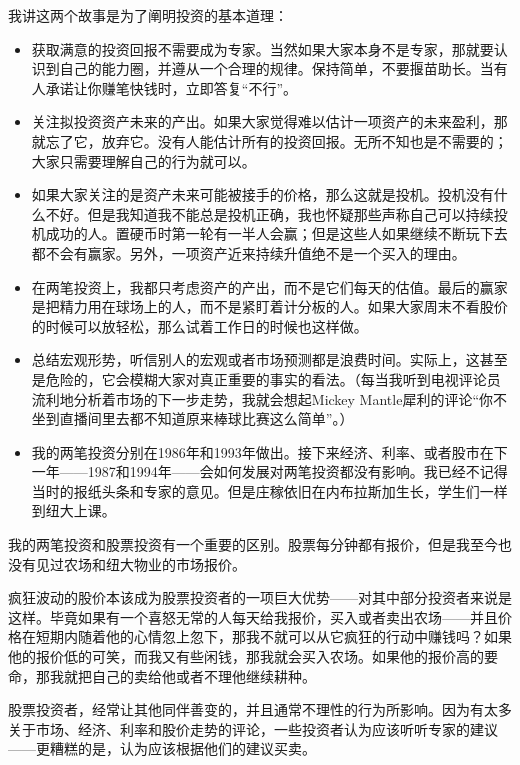 \documentclass[UTF8,a4paper,zihao=-4,fontset = windows]{ctexart} %
\begin{document}
我讲这两个故事是为了阐明投资的基本道理：
\begin{itemize}
    \item \noindent 获取满意的投资回报不需要成为专家。当然如果大家本身不是专家，那就要认识到自己的能力圈，并遵从一个合理的规律。保持简单，不要揠苗助长。当有人承诺让你赚笔快钱时，立即答复“不行”。

    \item \noindent 关注拟投资资产未来的产出。如果大家觉得难以估计一项资产的未来盈利，那就忘了它，放弃它。没有人能估计所有的投资回报。无所不知也是不需要的；大家只需要理解自己的行为就可以。

    \item \noindent 如果大家关注的是资产未来可能被接手的价格，那么这就是投机。投机没有什么不好。但是我知道我不能总是投机正确，我也怀疑那些声称自己可以持续投机成功的人。置硬币时第一轮有一半人会赢；但是这些人如果继续不断玩下去都不会有赢家。另外，一项资产近来持续升值绝不是一个买入的理由。

    \item \noindent 在两笔投资上，我都只考虑资产的产出，而不是它们每天的估值。最后的赢家是把精力用在球场上的人，而不是紧盯着计分板的人。如果大家周末不看股价的时候可以放轻松，那么试着工作日的时候也这样做。

    \item \noindent 总结宏观形势，听信别人的宏观或者市场预测都是浪费时间。实际上，这甚至是危险的，它会模糊大家对真正重要的事实的看法。（每当我听到电视评论员流利地分析着市场的下一步走势，我就会想起Mickey Mantle犀利的评论“你不坐到直播间里去都不知道原来棒球比赛这么简单”。）

    \item \noindent 我的两笔投资分别在1986年和1993年做出。接下来经济、利率、或者股市在下一年——1987和1994年——会如何发展对两笔投资都没有影响。我已经不记得当时的报纸头条和专家的意见。但是庄稼依旧在内布拉斯加生长，学生们一样到纽大上课。
    \end{itemize}

我的两笔投资和股票投资有一个重要的区别。股票每分钟都有报价，但是我至今也没有见过农场和纽大物业的市场报价。

疯狂波动的股价本该成为股票投资者的一项巨大优势——对其中部分投资者来说是这样。毕竟如果有一个喜怒无常的人每天给我报价，买入或者卖出农场——并且价格在短期内随着他的心情忽上忽下，那我不就可以从它疯狂的行动中赚钱吗？如果他的报价低的可笑，而我又有些闲钱，那我就会买入农场。如果他的报价高的要命，那我就把自己的卖给他或者不理他继续耕种。

股票投资者，经常让其他同伴善变的，并且通常不理性的行为所影响。因为有太多关于市场、经济、利率和股价走势的评论，一些投资者认为应该听听专家的建议——更糟糕的是，认为应该根据他们的建议买卖。
\end{document}
